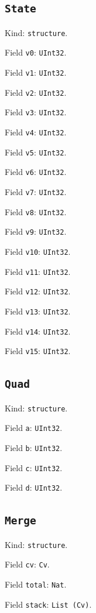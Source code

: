 \documentclass[11pt]{article}
\begin{document}
\subsection*{\texttt{State}}
\noindent Kind: \texttt{structure}.\par
\noindent Field \texttt{v0}: \texttt{UInt32}.\par
\noindent Field \texttt{v1}: \texttt{UInt32}.\par
\noindent Field \texttt{v2}: \texttt{UInt32}.\par
\noindent Field \texttt{v3}: \texttt{UInt32}.\par
\noindent Field \texttt{v4}: \texttt{UInt32}.\par
\noindent Field \texttt{v5}: \texttt{UInt32}.\par
\noindent Field \texttt{v6}: \texttt{UInt32}.\par
\noindent Field \texttt{v7}: \texttt{UInt32}.\par
\noindent Field \texttt{v8}: \texttt{UInt32}.\par
\noindent Field \texttt{v9}: \texttt{UInt32}.\par
\noindent Field \texttt{v10}: \texttt{UInt32}.\par
\noindent Field \texttt{v11}: \texttt{UInt32}.\par
\noindent Field \texttt{v12}: \texttt{UInt32}.\par
\noindent Field \texttt{v13}: \texttt{UInt32}.\par
\noindent Field \texttt{v14}: \texttt{UInt32}.\par
\noindent Field \texttt{v15}: \texttt{UInt32}.\par
\subsection*{\texttt{Quad}}
\noindent Kind: \texttt{structure}.\par
\noindent Field \texttt{a}: \texttt{UInt32}.\par
\noindent Field \texttt{b}: \texttt{UInt32}.\par
\noindent Field \texttt{c}: \texttt{UInt32}.\par
\noindent Field \texttt{d}: \texttt{UInt32}.\par
\subsection*{\texttt{Merge}}
\noindent Kind: \texttt{structure}.\par
\noindent Field \texttt{cv}: \texttt{Cv}.\par
\noindent Field \texttt{total}: \texttt{Nat}.\par
\noindent Field \texttt{stack}: \texttt{List (Cv)}.\par
\end{document}
